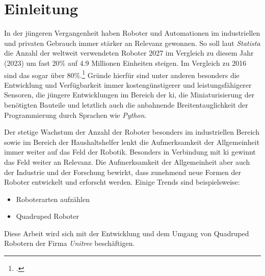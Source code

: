 \section{Einleitung}
\label{sec:einleitung}

In der jüngeren Vergangenheit haben Roboter und Automationen im industriellen und privaten Gebrauch immer stärker an Relevanz gewonnen.
So soll laut \emph{Statista} die Anzahl der weltweit verwendeten Roboter \num{2027} im Vergleich zu diesem Jahr (\num{2023})
um fast \num{20}\% auf \num{4,9} Millionen Einheiten steigen.
Im Vergleich zu \num{2016} sind das sogar über \num{80}\%.\footcite{statista_robotics_market}
Gründe hierfür sind unter anderen besonders die Entwicklung und Verfügbarkeit immer kostengünstigerer und leistungsfähigerer Sensoren,
die jüngere Entwicklungen im Bereich der \gls{ki}, die Miniaturisierung der benötigten Bauteile und letztlich auch
die anbahnende Breitentauglichkeit der Programmierung durch Sprachen wie \emph{Python}.


Der stetige Wachstum der Anzahl der Roboter besonders im industriellen Bereich sowie im Bereich der Haushaltshelfer
lenkt die Aufmerksamkeit der Allgemeinheit immer weiter auf das Feld der Robotik. 
Besonders in Verbindung mit \gls{ki} gewinnt das Feld weiter an Relevanz.
Die Aufmerksamkeit der Allgemeinheit aber auch der Industrie und der Forschung bewirkt, dass zunehmend neue Formen
der Roboter entwickelt und erforscht werden.
Einige Trends sind beispielsweise:

\begin{itemize}
    \item Roboterarten aufzählen
    \item Quadruped Roboter
\end{itemize}

Diese Arbeit wird sich mit der Entwicklung und dem Umgang von Quadruped Robotern der Firma \emph{Unitree} beschäftigen.










